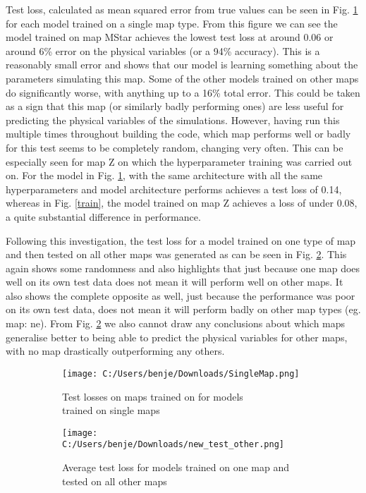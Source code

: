 \documentclass[11pt]{scrartcl}
\begin{document}
Test loss, calculated as mean squared error from true values can be seen in Fig. \ref{fig:sub1} for each model trained on a single map type. From this figure we can see the model trained on map MStar achieves the lowest test loss at around 0.06 or around 6\% error on the physical variables (or a 94\% accuracy). This is a reasonably small error and shows that our model is learning something about the parameters simulating this map. Some of the other models trained on other maps do significantly worse, with anything up to a 16\% total error. This could be taken as a sign that this map (or similarly badly performing ones) are less useful for predicting the physical variables of the simulations. However, having run this multiple times throughout building the code, which map performs well or badly for this test seems to be completely random, changing very often. This can be especially seen for map Z on which the hyperparameter training was carried out on. For the model in Fig. \ref{fig:sub1}, with the same architecture with all the same hyperparameters and model architecture performs achieves a test loss of 0.14, whereas in Fig. \ref{train}, the model trained on map Z achieves a loss of under 0.08, a quite substantial difference in performance. 

Following this investigation, the test loss for a model trained on one type of map and then tested on all other maps was generated as can be seen in Fig. \ref{fig:sub2}. This again shows some randomness and also highlights that just because one map does well on its own test data does not mean it will perform well on other maps. It also shows the complete opposite as well, just because the performance was poor on its own test data, does not mean it will perform badly on other map types (eg. map: ne). From Fig. \ref{fig:sub2} we also cannot draw any conclusions about which maps generalise better to being able to predict the physical variables for other maps, with no map drastically outperforming any others.

\begin{figure}[H]
\centering
\begin{subfigure}{.5\textwidth}
  \centering
\texttt{[image: C:/Users/benje/Downloads/SingleMap.png]}
  \caption{Test losses on maps trained on for models \\trained on single maps}
  \label{fig:sub1}
\end{subfigure}%
\hfill
\begin{subfigure}{.5\textwidth}
  \centering
\texttt{[image: C:/Users/benje/Downloads/new\_test\_other.png]}
\caption{Average test loss for models trained on one map and tested on all other maps}
  \label{fig:sub2}
\end{subfigure}
\label{fig:test}
\caption{}
\end{figure}
\end{document}
